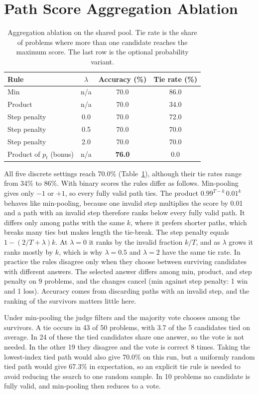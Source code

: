 \documentclass{article}
\begin{document}
\section{Path Score Aggregation Ablation}
\begin{table}[t]
\centering
\caption{Aggregation ablation on the shared pool. Tie rate is the share of problems where more than one candidate reaches the maximum score. The last row is the optional probability variant.}
\label{tab:ablation}
\footnotesize
\begin{tabular}{lccc}
\toprule
Rule & $\lambda$ & Accuracy (\%) & Tie rate (\%) \\
\midrule
Min & n/a & 70.0 & 86.0 \\
Product & n/a & 70.0 & 34.0 \\
Step penalty & 0.0 & 70.0 & 72.0 \\
Step penalty & 0.5 & 70.0 & 70.0 \\
Step penalty & 2.0 & 70.0 & 70.0 \\
Product of $p_t$ (bonus) & n/a & \textbf{76.0} & 0.0 \\
\bottomrule
\end{tabular}
\end{table}

All five discrete settings reach 70.0\% (Table~\ref{tab:ablation}), although their tie rates range from 34\% to 86\%. With binary scores the rules differ as follows. Min-pooling gives only $-1$ or $+1$, so every fully valid path ties. The product $0.99^{T-k}\,0.01^{k}$ behaves like min-pooling, because one invalid step multiplies the score by 0.01 and a path with an invalid step therefore ranks below every fully valid path. It differs only among paths with the same $k$, where it prefers shorter paths, which breaks many ties but makes length the tie-break. The step penalty equals $1-(2/T+\lambda)k$. At $\lambda=0$ it ranks by the invalid fraction $k/T$, and as $\lambda$ grows it ranks mostly by $k$, which is why $\lambda=0.5$ and $\lambda=2$ have the same tie rate. In practice the rules disagree only when they choose between surviving candidates with different answers. The selected answer differs among min, product, and step penalty on 9 problems, and the changes cancel (min against step penalty: 1 win and 1 loss). Accuracy comes from discarding paths with an invalid step, and the ranking of the survivors matters little here.

Under min-pooling the judge filters and the majority vote chooses among the survivors. A tie occurs in 43 of 50 problems, with 3.7 of the 5 candidates tied on average. In 24 of these the tied candidates share one answer, so the vote is not needed. In the other 19 they disagree and the vote is correct 8 times. Taking the lowest-index tied path would also give 70.0\% on this run, but a uniformly random tied path would give 67.3\% in expectation, so an explicit tie rule is needed to avoid reducing the search to one random sample. In 10 problems no candidate is fully valid, and min-pooling then reduces to a vote.
\end{document}
